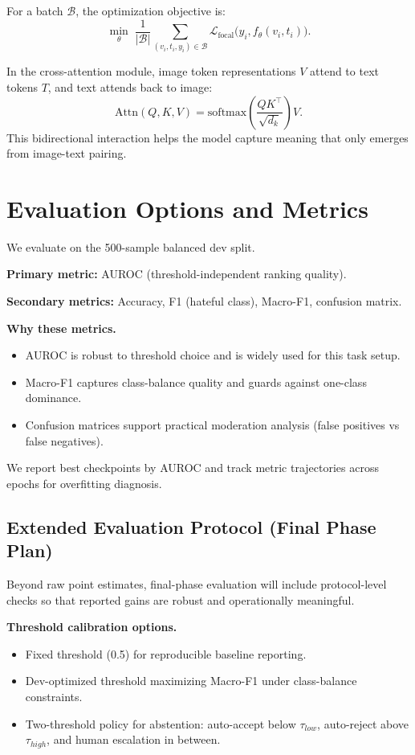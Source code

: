 \documentclass[11pt]{article}
\begin{document}
For a batch \(\mathcal{B}\), the optimization objective is:
\[
\min_\theta \; \frac{1}{|\mathcal{B}|} \sum_{(v_i,t_i,y_i)\in\mathcal{B}}
\mathcal{L}_{\text{focal}}\big(y_i, f_\theta(v_i,t_i)\big).
\]

In the cross-attention module, image token representations \(V\) attend to text tokens \(T\), and text attends back to image:
\[
\text{Attn}(Q,K,V)=\text{softmax}\left(\frac{QK^\top}{\sqrt{d_k}}\right)V.
\]
This bidirectional interaction helps the model capture meaning that only emerges from image-text pairing.

\section{Evaluation Options and Metrics}
We evaluate on the 500-sample balanced dev split.

\textbf{Primary metric:} AUROC (threshold-independent ranking quality).

\textbf{Secondary metrics:} Accuracy, F1 (hateful class), Macro-F1, confusion matrix.

\textbf{Why these metrics.}
\begin{itemize}[leftmargin=*,nosep]
  \item AUROC is robust to threshold choice and is widely used for this task setup.
  \item Macro-F1 captures class-balance quality and guards against one-class dominance.
  \item Confusion matrices support practical moderation analysis (false positives vs false negatives).
\end{itemize}

We report best checkpoints by AUROC and track metric trajectories across epochs for overfitting diagnosis.

\subsection{Extended Evaluation Protocol (Final Phase Plan)}
Beyond raw point estimates, final-phase evaluation will include protocol-level checks so that reported gains are robust and operationally meaningful.

\textbf{Threshold calibration options.}
\begin{itemize}[leftmargin=*,nosep]
  \item Fixed threshold (0.5) for reproducible baseline reporting.
  \item Dev-optimized threshold maximizing Macro-F1 under class-balance constraints.
  \item Two-threshold policy for abstention: auto-accept below \(\tau_{low}\), auto-reject above \(\tau_{high}\), and human escalation in between.
\end{itemize}
\end{document}
